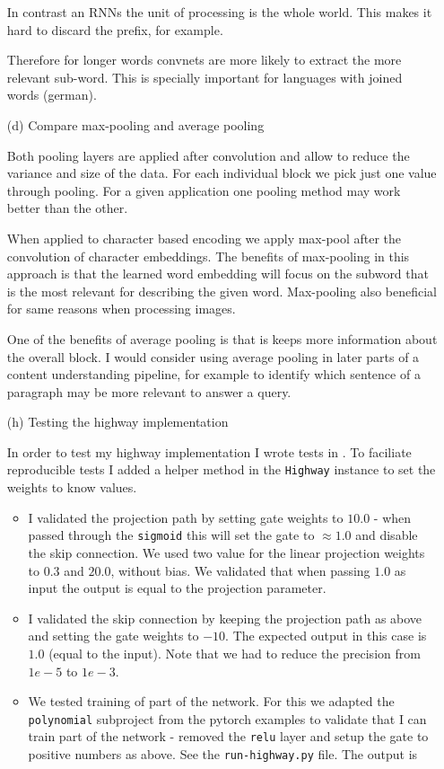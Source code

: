\documentclass{article}
\begin{document}
\begin{enumerate}
In contrast an RNNs the unit of processing is the whole world. This makes it hard to discard the prefix, for example. 

Therefore for longer words convnets are more likely to extract the more relevant sub-word. This is specially important for languages with joined words (german).

\clearpage

\item[(d)]{Compare max-pooling and average pooling}

Both pooling layers are applied after convolution and allow to reduce the variance and size of the data. For each individual block we pick just one value through pooling. For a given application one pooling method may work better than the other.

When applied to character based encoding we apply max-pool after the convolution of  character embeddings. The benefits of max-pooling in this approach is that the learned word embedding will focus on the subword that is the most relevant for describing the given word. Max-pooling also beneficial for same reasons when processing images.

One of the benefits of average pooling is that is keeps more information about the overall block. I would consider using average pooling in later parts of a content understanding pipeline, for example to identify which sentence of a paragraph may be more relevant to answer a query.

\clearpage
\item[(h)]{Testing the highway implementation}

In order to test my highway implementation I wrote tests in . To faciliate reproducible tests I added a helper method in the \texttt{Highway} instance to set the weights to know values.

\begin{itemize}
\item I validated the projection path by setting gate weights to $10.0$ - when passed through the \texttt{sigmoid} this will set the gate to $\approx 1.0$ and disable the skip connection. We used two value for the linear projection weights to $0.3$ and $20.0$, without bias. We validated that when passing $1.0$ as input the output is equal to the projection parameter.
\item I validated the skip connection by keeping the projection path as above and setting the gate weights to $-10$. The expected output in this case is $1.0$ (equal to the input). Note that we had to reduce the precision from $1e-5$ to $1e-3$.
\item We tested training of part of the network. For this we adapted the \texttt{polynomial} subproject from the pytorch examples to validate that I can train part of the network - removed the \texttt{relu} layer and setup the gate to positive numbers as above. See the \texttt{run-highway.py} file. The output is


\end{itemize}
\end{enumerate}
\end{document}
